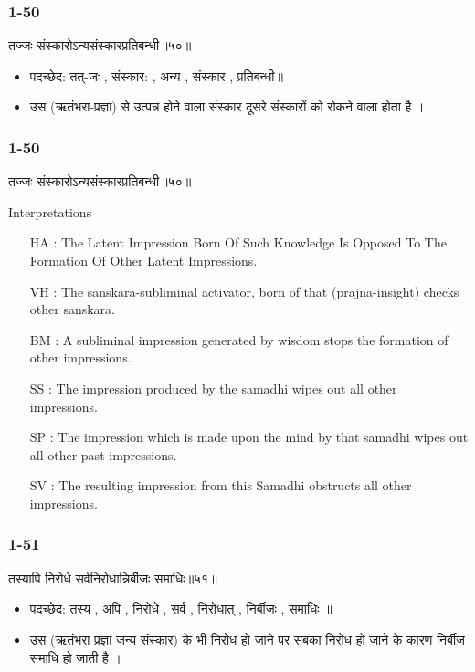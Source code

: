 \begin{frame}[fragile]\frametitle{1-50}
\begin{sanskrit}
तज्जः संस्कारोऽन्यसंस्कारप्रतिबन्धी॥५०॥
\end{sanskrit}

\begin{itemize}
\item पदच्छेद: तत्-जः , संस्कार: , अन्य , संस्कार , प्रतिबन्धी॥
\item उस (ऋतंभरा-प्रज्ञा) से उत्पन्न होने वाला संस्कार दूसरे संस्कारों को रोकने वाला होता है ।
\end{itemize}
	
\end{frame}


\begin{frame}[fragile]\frametitle{1-50}
\begin{sanskrit}
तज्जः संस्कारोऽन्यसंस्कारप्रतिबन्धी॥५०॥
\end{sanskrit}

Interpretations
\begin{itemize}
\item [HA]: The Latent Impression Born Of Such Knowledge Is Opposed To The Formation Of Other Latent Impressions.
\item [VH]: The sanskara-subliminal activator, born of that (prajna-insight) checks other sanskara.
\item [BM]: A subliminal impression generated by wisdom stops the formation of other impressions.
\item [SS]: The impression produced by the samadhi wipes out all other impressions.
\item [SP]: The impression which is made upon the mind by that samadhi wipes out all other past impressions.
\item [SV]: The resulting impression from this Samadhi obstructs all other impressions. 
\end{itemize}
	
\end{frame}


\begin{frame}[fragile]\frametitle{1-51}
\begin{sanskrit}
तस्यापि निरोधे सर्वनिरोधान्निर्बीजः समाधिः॥५१॥
\end{sanskrit}

\begin{itemize}
\item पदच्छेद: तस्य , अपि , निरोधे , सर्व , निरोधात् , निर्बीजः , समाधिः ॥
\item उस (ऋतंभरा प्रज्ञा जन्य संस्कार) के भी निरोध हो जाने पर सबका निरोध हो जाने के कारण निर्बीज समाधि हो जाती है ।
\end{itemize}
	
\end{frame}

